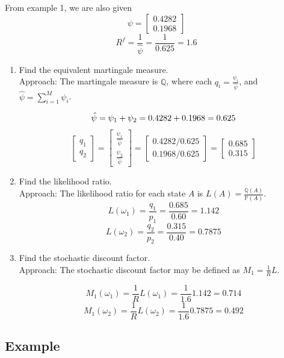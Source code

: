 \documentclass[11pt]{article}
\begin{document}
From example 1, we are also given 
\[
\psi = \begin{bmatrix}
    0.4282 \\ 
    0.1968
\end{bmatrix}    
\]
\[
    R^f = \frac{1}{\hat{\psi}} = \frac{1}{0.625} = 1.6
\]

\begin{enumerate}
    \item Find the equivalent martingale measure. \\
    Approach: The martingale measure is $\mathbb{Q}$, where each $q_i = \frac{\psi_i}
    {\hat{\psi}}$, and $\hat{\psi} = \sum_{i=1}^{M} \psi_i$.

    \[
    \hat{\psi} = \psi_1 + \psi_2 = 0.4282 + 0.1968 = 0.625 \\
    \]
    \[
    \begin{bmatrix}
        q_1 \\
        q_2
    \end{bmatrix} = 
    \begin{bmatrix}
        \frac{\psi_1}{\hat{\psi}} \\
        \frac{\psi_2}{\hat{\psi}}
    \end{bmatrix} = 
    \begin{bmatrix}
        0.4282/0.625 \\
        0.1968/0.625
    \end{bmatrix} = 
    \begin{bmatrix}
        0.685 \\
        0.315
    \end{bmatrix}
    \]
    \item Find the likelihood ratio. \\
    Approach: The likelihood ratio for each state $A$ is $L(A) = \frac{\mathbb{Q}(A)}
    {\mathbb{P}(A)}$.
    \[L(\omega_1) = \frac{q_1}{p_1} = \frac{0.685}{0.60} = 1.142\]
    \[L(\omega_2) = \frac{q_2}{p_2} = \frac{0.315}{0.40} = 0.7875\]

    \item Find the stochastic discount factor. \\
    Approach: The stochastic discount factor may be defined as $M_1 = \frac{1}{R}L$. 

    \[M_1(\omega_1) = \frac{1}{R} L(\omega_1) = \frac{1}{1.6} 1.142 = 0.714\]
    \[M_1(\omega_2) = \frac{1}{R} L(\omega_2) = \frac{1}{1.6} 0.7875 = 0.492\]
\end{enumerate}

\subsection{Example}
\end{document}
